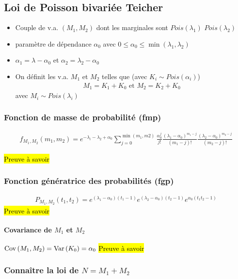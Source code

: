 \documentclass[10pt, french]{article}
\begin{document}
\begin{multicols*}{2}
\subsection{Loi de Poisson bivariée Teicher}
\begin{itemize}
\item Couple de v.a. $(M_1, M_2)$ dont les marginales sont $Pois(\lambda_1)$ $Pois(\lambda_2)$
\item paramètre de dépendance $\alpha_0$ avec $0 \leq \alpha_0 \leq \min(\lambda_1, \lambda_2)$
\item $\alpha_1 = \lambda - \alpha_0$ et $\alpha_2 = \lambda_2 - \alpha_0$
\item On définit les v.a. $M_1$ et $M_2$ telles que (avec $K_i \sim Pois(\alpha_i)$)
\begin{align*}
M_1 = K_1 + K_0 \text{ et } M_2 = K_2 + K_0
\end{align*}
avec $M_i \sim Pois(\lambda_i)$
\end{itemize}

\subsubsection{Fonction de masse de probabilité (fmp)}

\begin{align*}
f_{M_1, M_2}(m_1, m_2) = e^{-\lambda_i - \lambda_2 + \alpha_0} \sum_{j=0}^{\min(m_1, m2)} \frac{\alpha_0^{j}}{j!} \frac{(\lambda_1 - \alpha_0)^{m_1 - j}}{(m_1 - j)!} \frac{(\lambda_2 - \alpha_0)^{m_2 - j}}{(m_2 - j)!}
\end{align*}



\hl{Preuve à savoir}

\subsubsection{Fonction génératrice des probabilités (fgp)}
\begin{align*}
P_{M_1, M_2}(t_1, t_2) = e^{(\lambda_1 - \alpha_0)(t_1 -1)} e^{(\lambda_2 - \alpha_0)(t_2 - 1)} e^{\alpha_0(t_1 t_2 - 1)}
\end{align*}
\hl{Preuve à savoir}

\paragraph{Covariance de $M_1$ et $M_2$} $\mathrm{Cov} \left( M_1, M_2 \right) = \mathrm{Var} \left( K_0 \right) = \alpha_0$
\hl{Preuve à savoir}

\subsubsection{Connaître la loi de $N = M_1 + M_2$}




\end{multicols*}
\end{document}
